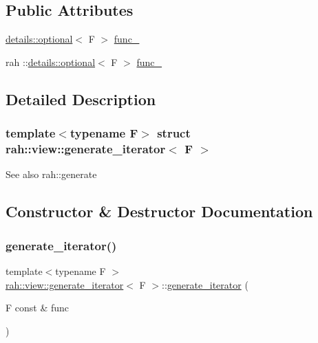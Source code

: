 \subsection*{Public Attributes}
\begin{DoxyCompactItemize}
\item 
\mbox{\hyperlink{structrah_1_1view_1_1details_1_1optional}{details\+::optional}}$<$ F $>$ \mbox{\hyperlink{structrah_1_1view_1_1generate__iterator_a05bac9e07fa0f0f285f79dec0337ca68}{func\+\_\+}}
\item 
rah \+::\mbox{\hyperlink{structrah_1_1view_1_1details_1_1optional}{details\+::optional}}$<$ F $>$ \mbox{\hyperlink{structrah_1_1view_1_1generate__iterator_a1ed574d1a5a840a51e7d76b9d741a7aa}{func\+\_\+}}
\end{DoxyCompactItemize}


\subsection{Detailed Description}
\subsubsection*{template$<$typename F$>$\newline
struct rah\+::view\+::generate\+\_\+iterator$<$ F $>$}

\begin{DoxySeeAlso}{See also}
rah\+::generate 
\end{DoxySeeAlso}


\subsection{Constructor \& Destructor Documentation}
\mbox{\label{structrah_1_1view_1_1generate__iterator_a407696209d96fe38234970a91d23e35f}} 
\subsubsection{\texorpdfstring{generate\_iterator()}{generate\_iterator()}\hspace{0.1cm}{\footnotesize\ttfamily [1/2]}}
{\footnotesize\ttfamily template$<$typename F $>$ \\
\mbox{\hyperlink{structrah_1_1view_1_1generate__iterator}{rah\+::view\+::generate\+\_\+iterator}}$<$ F $>$\+::\mbox{\hyperlink{structrah_1_1view_1_1generate__iterator}{generate\+\_\+iterator}} (\begin{DoxyParamCaption}\item[{F const \&}]{func }\end{DoxyParamCaption})\hspace{0.3cm}{\ttfamily [inline]}}

